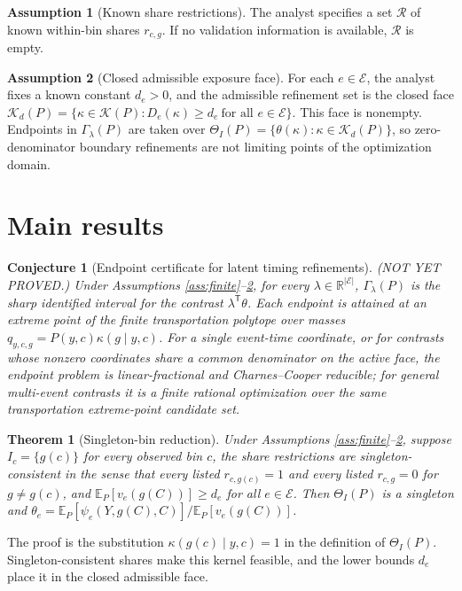\documentclass[11pt]{article}
\newcommand{\E}{\mathbb{E}}
\newcommand{\transpose}{\mathsf{T}}
\newcommand{\R}{\mathbb{R}}
\theoremstyle{definition}
\newtheorem{assumption}{Assumption}
\theoremstyle{plain}
\newtheorem{theorem}{Theorem}
\newtheorem{conjecture}{Conjecture}
\theoremstyle{remark}
\begin{document}
\begin{assumption}[Known share restrictions]\label{ass:shares}
The analyst specifies a set \(\mathcal R\) of known within-bin shares \(r_{c,g}\). If no validation information is available, \(\mathcal R\) is empty.
\end{assumption}

\begin{assumption}[Closed admissible exposure face]\label{ass:denom}
For each \(e\in\mathcal E\), the analyst fixes a known constant \(d_e>0\), and the admissible refinement set is the closed face \(\mathcal K_d(P)=\{\kappa\in\mathcal K(P):D_e(\kappa)\ge d_e\ \text{for all }e\in\mathcal E\}\). This face is nonempty. Endpoints in \(\Gamma_\lambda(P)\) are taken over \(\Theta_I(P)=\{\theta(\kappa):\kappa\in\mathcal K_d(P)\}\), so zero-denominator boundary refinements are not limiting points of the optimization domain.
\end{assumption}

\section{Main results}
\begin{conjecture}[Endpoint certificate for latent timing refinements]\label{conj:endpoint}
(NOT YET PROVED.) Under Assumptions \ref{ass:finite}--\ref{ass:denom}, for every \(\lambda\in\R^{|\mathcal E|}\), \(\Gamma_\lambda(P)\) is the sharp identified interval for the contrast \(\lambda^\transpose\theta\). Each endpoint is attained at an extreme point of the finite transportation polytope over masses \(q_{y,c,g}=P(y,c)\kappa(g\mid y,c)\). For a single event-time coordinate, or for contrasts whose nonzero coordinates share a common denominator on the active face, the endpoint problem is linear-fractional and Charnes--Cooper reducible; for general multi-event contrasts it is a finite rational optimization over the same transportation extreme-point candidate set.
\end{conjecture}

\begin{theorem}[Singleton-bin reduction]\label{thm:singleton}
Under Assumptions \ref{ass:finite}--\ref{ass:denom}, suppose \(I_c=\{g(c)\}\) for every observed bin \(c\), the share restrictions are singleton-consistent in the sense that every listed \(r_{c,g(c)}=1\) and every listed \(r_{c,g}=0\) for \(g\ne g(c)\), and \(\E_P[v_e(g(C))]\ge d_e\) for all \(e\in\mathcal E\). Then \(\Theta_I(P)\) is a singleton and \(\theta_e=\E_P[\psi_e(Y,g(C),C)]/\E_P[v_e(g(C))]\).
\end{theorem}
The proof is the substitution \(\kappa(g(c)\mid y,c)=1\) in the definition of \(\Theta_I(P)\). Singleton-consistent shares make this kernel feasible, and the lower bounds \(d_e\) place it in the closed admissible face.
\end{document}
